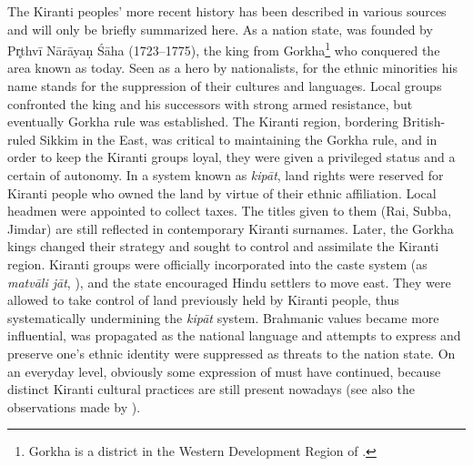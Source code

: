 The Kiranti peoples' more recent history has been described in various sources  \citep{Caplan1970_Land, Pradhan1991The-Gorkha, Gaenszle2002_Remaking, Schlemmer2003_New, Whelpton2005A-History} and will  only be briefly summarized here. As a nation state,  was founded by Pr̥thvī Nārāyaṇ Śāha (1723--1775), the king from Gorkha\footnote{Gorkha is a district in the Western Development Region of .} who conquered the area known as  today. Seen as a hero by  nationalists, for the ethnic minorities his name stands for the suppression of their cultures and languages. Local groups confronted the king and his successors with strong armed resistance, but eventually Gorkha rule was established. The Kiranti region, bordering British-ruled Sikkim in the East, was critical to maintaining the Gorkha rule, and in order to keep the Kiranti groups loyal, they were given a privileged status and a certain  of autonomy. In a system known as \emph{kipāt}, land rights were reserved for Kiranti people who owned the land by virtue of their ethnic affiliation. Local headmen were appointed to collect taxes. The titles given to them (Rai, Subba, Jimdar) are still reflected in contemporary Kiranti surnames. Later, the Gorkha kings changed their strategy and sought to control and assimilate the Kiranti region. Kiranti groups were officially incorporated into the caste system (as \emph{matvāli jāt}, ), and the state encouraged Hindu settlers to move east. They were allowed to take control of land previously held by Kiranti people, thus systematically undermining the \emph{kipāt} system. Brahmanic values became more influential,  was propagated as the national language and attempts to express and preserve one's ethnic identity were suppressed as threats to the nation state. On an everyday level,  obviously some expression of  must have continued, because distinct Kiranti cultural practices are still present nowadays (see also the observations made by \citealt{Russell2004Traditions}).
 
